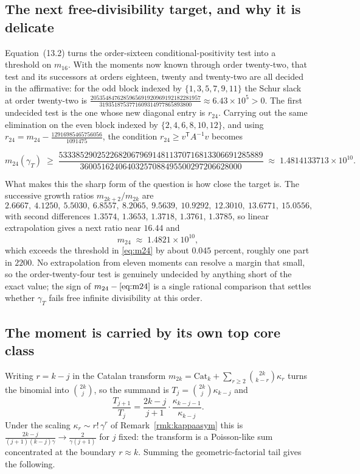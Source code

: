 \subsection*{The next free-divisibility target, and why it is delicate}

Equation~(13.2) turns the order-sixteen conditional-positivity test into
a threshold on $m_{16}$.  With the moments now known through order
twenty-two, that test and its successors at orders eighteen, twenty and
twenty-two are all decided in the affirmative: for the odd block indexed
by $\{1,3,5,7,9,11\}$ the Schur slack at order twenty-two is
$\tfrac{2053548476285965691920969192182281957}
{3193518753771609314977865893800}\approx6.43\times10^{5}>0$.  The first
undecided test is the one whose new diagonal entry is $r_{24}$.  Carrying
out the same elimination on the even block indexed by
$\{2,4,6,8,10,12\}$, and using
$r_{24}=m_{24}-\tfrac{12916985465756056}{1091475}$, the condition
$r_{24}\ge v^{\mathsf T}A^{-1}v$ becomes

\begin{equation}\label{eq:m24}
m_{24}(\gamma_T)\;\ge\;
\frac{533385290252268206796914811370716813306691285889}
{36005162406403257088495500297206628000}
\;\approx\;1.4814133713\times10^{10}.
\end{equation}

What makes this the sharp form of the question is how close the target
is.  The successive growth ratios $m_{2k+2}/m_{2k}$ are
\[
2.6667,\ 4.1250,\ 5.5030,\ 6.8557,\ 8.2065,\ 9.5639,\ 10.9292,\
12.3010,\ 13.6771,\ 15.0556,
\]
with second differences $1.3574$, $1.3653$, $1.3718$, $1.3761$,
$1.3785$, so linear extrapolation gives a next ratio near $16.44$ and
\[
m_{24}\;\approx\;1.4821\times10^{10},
\]
which exceeds the threshold in \eqref{eq:m24} by about $0.045$ percent,
roughly one part in $2200$.  No extrapolation from eleven moments can
resolve a margin that small, so the order-twenty-four test is genuinely
undecided by anything short of the exact value; the sign of
$m_{24}-\eqref{eq:m24}$ is a single rational comparison that settles
whether $\gamma_T$ fails free infinite divisibility at this order.

\subsection*{The moment is carried by its own top core class}

Writing $r=k-j$ in the Catalan transform
$m_{2k}=\mathrm{Cat}_k+\sum_{r\ge2}\binom{2k}{k-r}\kappa_r$ turns the
binomial into $\binom{2k}{j}$, so the summand is
$T_j=\binom{2k}{j}\kappa_{k-j}$ and
\[
\frac{T_{j+1}}{T_j}=\frac{2k-j}{j+1}\cdot\frac{\kappa_{k-j-1}}{\kappa_{k-j}} .
\]
Under the scaling $\kappa_r\sim r!\,\gamma^r$ of
Remark~\ref{rmk:kappaasym} this is
$\frac{2k-j}{(j+1)(k-j)\gamma}\to\frac{2}{\gamma(j+1)}$ for $j$ fixed:
the transform is a Poisson-like sum concentrated at the boundary
$r\approx k$.  Summing the geometric-factorial tail gives the following.

